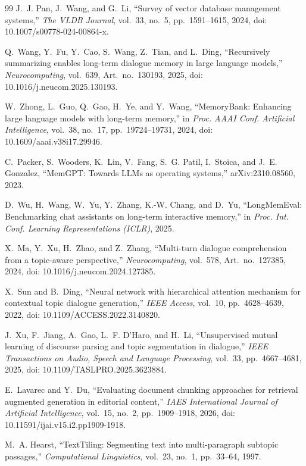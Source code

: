 \documentclass[journal]{IEEEtran}
\begin{document}
\begin{thebibliography}{99}
J.~J. Pan, J.~Wang, and G.~Li, ``Survey of vector database management systems,'' \emph{The VLDB Journal}, vol.~33, no.~5, pp.~1591--1615, 2024, doi: 10.1007/s00778-024-00864-x.

Q.~Wang, Y.~Fu, Y.~Cao, S.~Wang, Z.~Tian, and L.~Ding, ``Recursively summarizing enables long-term dialogue memory in large language models,'' \emph{Neurocomputing}, vol.~639, Art.~no.~130193, 2025, doi: 10.1016/j.neucom.2025.130193.

W.~Zhong, L.~Guo, Q.~Gao, H.~Ye, and Y.~Wang, ``MemoryBank: Enhancing large language models with long-term memory,'' in \emph{Proc. AAAI Conf. Artificial Intelligence}, vol.~38, no.~17, pp.~19724--19731, 2024, doi: 10.1609/aaai.v38i17.29946.

C.~Packer, S.~Wooders, K.~Lin, V.~Fang, S.~G. Patil, I.~Stoica, and J.~E. Gonzalez, ``MemGPT: Towards LLMs as operating systems,'' arXiv:2310.08560, 2023.

D.~Wu, H.~Wang, W.~Yu, Y.~Zhang, K.-W. Chang, and D.~Yu, ``LongMemEval: Benchmarking chat assistants on long-term interactive memory,'' in \emph{Proc. Int. Conf. Learning Representations (ICLR)}, 2025.

X.~Ma, Y.~Xu, H.~Zhao, and Z.~Zhang, ``Multi-turn dialogue comprehension from a topic-aware perspective,'' \emph{Neurocomputing}, vol.~578, Art.~no.~127385, 2024, doi: 10.1016/j.neucom.2024.127385.

X.~Sun and B.~Ding, ``Neural network with hierarchical attention mechanism for contextual topic dialogue generation,'' \emph{IEEE Access}, vol.~10, pp.~4628--4639, 2022, doi: 10.1109/ACCESS.2022.3140820.

J.~Xu, F.~Jiang, A.~Gao, L.~F. D'Haro, and H.~Li, ``Unsupervised mutual learning of discourse parsing and topic segmentation in dialogue,'' \emph{IEEE Transactions on Audio, Speech and Language Processing}, vol.~33, pp.~4667--4681, 2025, doi: 10.1109/TASLPRO.2025.3623884.

E.~Lavarec and Y.~Du, ``Evaluating document chunking approaches for retrieval augmented generation in editorial content,'' \emph{IAES International Journal of Artificial Intelligence}, vol.~15, no.~2, pp.~1909--1918, 2026, doi: 10.11591/ijai.v15.i2.pp1909-1918.

M.~A. Hearst, ``TextTiling: Segmenting text into multi-paragraph subtopic passages,'' \emph{Computational Linguistics}, vol.~23, no.~1, pp.~33--64, 1997.


\end{thebibliography}
\end{document}
